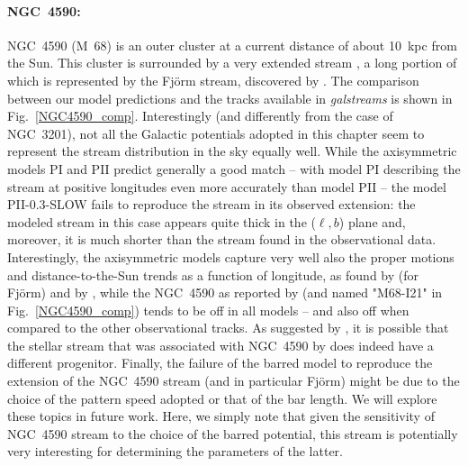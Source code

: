             \paragraph{NGC~4590: } NGC~4590 (M~68) is an outer cluster at a current distance of about 10~kpc from the Sun. This cluster is surrounded by a very extended stream \citep{2019MNRAS.488.1535P, 2021ApJ...914..123I}, a long portion of which is represented by the Fj\"{o}rm stream, discovered by \citet{2021ApJ...914..123I}. The comparison between our model predictions and the tracks available in \textit{galstreams} is shown in Fig.~\ref{NGC4590_comp}. Interestingly (and differently from the case of NGC~3201), not all the Galactic potentials adopted in this chapter seem to represent the stream distribution in the sky equally well. While the axisymmetric models PI and PII predict generally a good match -- with model PI describing the stream at positive longitudes even more accurately than model PII -- the model PII-0.3-SLOW fails to reproduce the stream in its observed extension: the modeled stream in this case appears quite thick in the ($\ell, b$) plane and, moreover, it is much shorter than the stream found in the observational data. Interestingly, the axisymmetric models capture very well also the proper motions and distance-to-the-Sun trends as a function of longitude, as found by \citet{2021ApJ...914..123I} (for  Fj\"{o}rm) and by \citet{2019MNRAS.488.1535P}, while the NGC~4590 as reported by \citet{2021ApJ...914..123I} (and named "M68-I21" in Fig.~\ref{NGC4590_comp}) tends to be off in all models -- and also off when compared to the other observational tracks. As suggested by \citet{2023MNRAS.520.5225M}, it is possible that the stellar stream that was associated with NGC~4590   by  \citet{2021ApJ...914..123I}does indeed have a different progenitor.  Finally, the failure of the barred model to reproduce the extension of the NGC~4590 stream (and in particular Fj\"{o}rm)  might be due to the choice of the pattern speed adopted or that of the bar length. We will explore these topics in future work. Here, we simply note that given the sensitivity of NGC~4590 stream to the choice of the barred potential, this stream is potentially very interesting for determining the parameters of the latter. 

